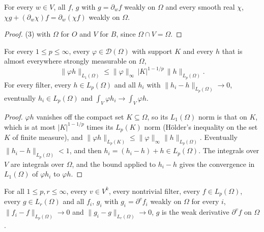 \begin{lemma}
\label{lem:weak-derivative-product}
\leanok
{}
For every $w \in V$, all $f$, $g$ with $g = \partial_w f$ weakly on $\Omega$ and every smooth
real $\chi$, $\chi g + (\partial_w \chi) f = \partial_w (\chi f)$ weakly on $\Omega$.
\end{lemma}

\begin{proof}
\leanok
{} (3) with $\Omega$ for $O$ and $V$ for $B$, since
$\Omega \cap V = \Omega$.
\end{proof}

\begin{lemma}
\label{lem:test-function-pairing}
\leanok
For every $1 \leq p \leq \infty$, every $\varphi \in \mathcal D(\Omega)$ with support $K$ and
every $h$ that is almost everywhere strongly measurable on $\Omega$,
\[
  \|\varphi h\|_{L_1(\Omega)} \leq \|\varphi\|_\infty \, |K|^{1 - 1/p} \, \|h\|_{L_p(\Omega)} .
\]
For every filter, every $h \in L_p(\Omega)$ and all $h_i$ with
$\|h_i - h\|_{L_p(\Omega)} \to 0$, eventually $h_i \in L_p(\Omega)$ and
$\int_V \varphi h_i \to \int_V \varphi h$.
\end{lemma}

\begin{proof}
\leanok
$\varphi h$ vanishes off the compact set $K \subseteq \Omega$, so its $L_1(\Omega)$ norm is that on
$K$, which is at most $|K|^{1 - 1/p}$ times its $L_p(K)$ norm (H\"older's inequality on the set
$K$ of finite measure), and $\|\varphi h\|_{L_p(K)} \leq \|\varphi\|_\infty \|h\|_{L_p(\Omega)}$.
Eventually $\|h_i - h\|_{L_p(\Omega)} < 1$, and then $h_i = (h_i - h) + h \in L_p(\Omega)$. The
integrals over $V$ are integrals over $\Omega$, and the bound applied to $h_i - h$ gives the
convergence in $L_1(\Omega)$ of $\varphi h_i$ to $\varphi h$.
\end{proof}

\begin{theorem}
\label{thm:weak-derivative-limits}
\leanok
{}
For all $1 \leq p, r \leq \infty$, every $v \in V^k$, every nontrivial filter, every
$f \in L_p(\Omega)$, every $g \in L_r(\Omega)$ and all $f_i$, $g_i$ with $g_i = \partial^v f_i$
weakly on $\Omega$ for every $i$, $\|f_i - f\|_{L_p(\Omega)} \to 0$ and
$\|g_i - g\|_{L_r(\Omega)} \to 0$, $g$ is the weak derivative $\partial^v f$ on $\Omega$.
\end{theorem}

